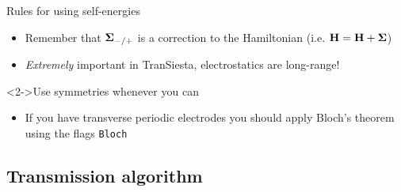 \begin{frame}
\begin{block}{Rules for using self-energies}
\begin{center}
    \end{center}

    \vspace{-12pt}

    \begin{itemize}
      \item<+-> Remember that $\boldsymbol{\Sigma}_{-/+}$ is a correction to the Hamiltonian (i.e. 
      $\mathbf{H} = \mathbf{H} + \boldsymbol{\Sigma}$)

      \item \emph{Extremely} important in TranSiesta, electrostatics are long-range!
    \end{itemize}
  \end{block}

  \begin{block}<2->{Use symmetries whenever you can}

    \begin{itemize}
      \item If you have transverse periodic electrodes you should apply Bloch's theorem
      using the flags \texttt{Bloch}
    \end{itemize}
    
  \end{block}

\end{frame}

\subsection{Transmission algorithm}




